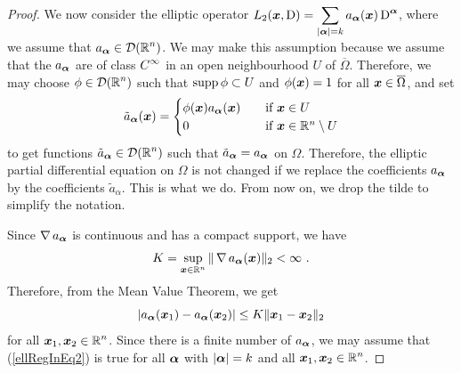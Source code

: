 \begin{proof}
 We now consider the elliptic operator
$\displaystyle L_2({\bm{x}},\operatorname{D})
= \sum_{|{\bm{\alpha}}|= k} a_{{\bm{\alpha}}}({\bm{x}}) \operatorname{D}^{{\bm{\alpha}}}$,
where we assume that $\displaystyle a_{{\bm{\alpha}}} \in \mathcal{D}(\mathbb{R}^n)$.
We may make this assumption because we assume that the $a_{{\bm{\alpha}}}$ are
of class $\displaystyle C^\infty$ in an open neighbourhood $U$ of
$\overline{\Omega}$.
Therefore, we may choose $\displaystyle \phi \in \mathcal{D}(\mathbb{R}^n)$ such that
$\operatorname{supp} \phi \subset U$ and $\phi({\bm{x}}) = 1$ for all
${\bm{x}} \in \overline{\Omega}$, and set
\[
\tilde{a}_{{\bm{\alpha}}}({\bm{x}})
= \begin{cases}
\phi({\bm{x}}) a_{{\bm{\alpha}}}({\bm{x}}) & \quad \text{if} \ {\bm{x}} \in U \\
0 & \quad \text{if} \ {\bm{x}} \in \mathbb{R}^n \setminus U
\end{cases}
\]
to get functions $\displaystyle \tilde{a}_{{\bm{\alpha}}} \in \mathcal{D}(\mathbb{R}^n)$
such that $\tilde{a}_{{\bm{\alpha}}} = a_{{\bm{\alpha}}}$ on $\Omega$.
Therefore, the elliptic partial differential equation on $\Omega$ is
not changed if we replace the coefficients $a_{{\bm{\alpha}}}$ by the
coefficients $\tilde{a}_\alpha$.
This is what we do.  From now on, we drop the tilde to simplify the notation.

Since $\operatorname{\nabla} a_{{\bm{\alpha}}}$ is continuous and has a compact support,
we have
\[
K = \sup_{{\bm{x}} \in \mathbb{R}^n} \|\operatorname{\nabla} a_{{\bm{\alpha}}} ({\bm{x}}) \|_2 < \infty \ .
\]
Therefore, from the Mean Value Theorem, we get
\begin{equation} \label{ellRegInEq2}
\left| a_{{\bm{\alpha}}}({\bm{x}}_1) - a_{{\bm{\alpha}}}({\bm{x}}_2) \right| \leq K
\|{\bm{x}}_1 - {\bm{x}}_2 \|_2
\end{equation}
for all $\displaystyle {\bm{x}}_1, {\bm{x}}_2 \in \mathbb{R}^n$.  Since there
is a finite number of $a_{{\bm{\alpha}}}$, we may assume that
(\ref{ellRegInEq2}) is true for all ${\bm{\alpha}}$ with $|{\bm{\alpha}}|=k$
and all $\displaystyle {\bm{x}}_1, {\bm{x}}_2 \in \mathbb{R}^n$.


\end{proof}
